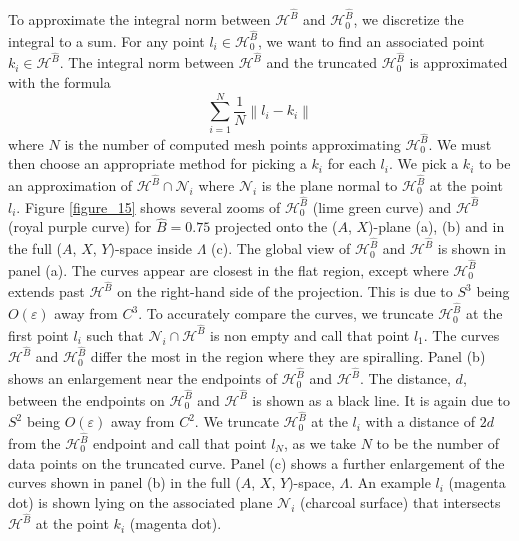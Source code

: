 \documentclass{ws-ijbc}
\begin{document}
To approximate the integral norm between $\mathscr{H}^{\widehat{B}}$ and $\mathscr{H}_0^{\widehat{B}}$, we discretize the integral to a sum.  For any point $l_i \in \mathscr{H}_0^{\widehat{B}}$, we want to find an associated point $k_i \in \mathscr{H}^{\widehat{B}}$.  The integral norm between $\mathscr{H}^{\widehat{B}}$ and the truncated $\mathscr{H}_0^{\widehat{B}}$ is approximated with the formula
	\begin{equation}
		\sum_{i=1}^{N} \frac{1}{N} \left \lVert l_i - k_i\right \lVert
		\label{integral_norm}
	\end{equation}
where $N$ is the number of computed mesh points approximating $\mathscr{H}_0^{\widehat{B}}$.  We must then choose an appropriate method for picking a $k_i$ for each $l_i$.  We pick a $k_i$ to be an approximation of $\mathscr{H}^{\widehat{B}} \cap \mathscr{N}_i$ where $\mathscr{N}_i$ is the plane normal to $\mathscr{H}_0^{\widehat{B}}$ at the point $l_i$.  Figure \ref{figure_15} shows several zooms of $\mathscr{H}_0^{\widehat{B}}$ (lime green curve) and $\mathscr{H}^{\widehat{B}}$ (royal purple curve) for $\widehat{B}=0.75$ projected onto the ($A$, $X$)-plane (a), (b) and in the full ($A$, $X$, $Y$)-space inside $\Lambda$ (c).  The global view of $\mathscr{H}_0^{\widehat{B}}$ and $\mathscr{H}^{\widehat{B}}$  is shown in panel (a).  The curves appear are closest in the flat region, except where $\mathscr{H}_0^{\widehat{B}}$ extends past $\mathscr{H}^{\widehat{B}}$ on the right-hand side of the projection.  This is due to $S^3$ being $O(\varepsilon)$ away from $C^3$.  To accurately compare the curves, we truncate $\mathscr{H}_0^{\widehat{B}}$ at the first point $l_i$ such that $\mathscr{N}_i\cap\mathscr{H}^{\widehat{B}}$ is non empty and call that point $l_1$.  The curves $\mathscr{H}^{\widehat{B}}$ and $\mathscr{H}_0^{\widehat{B}}$ differ the most in the region where they are spiralling.  Panel (b) shows an enlargement near the endpoints of $\mathscr{H}_0^{\widehat{B}}$ and $\mathscr{H}^{\widehat{B}}$.  The distance, $d$, between the endpoints on $\mathscr{H}_0^{\widehat{B}}$ and $\mathscr{H}^{\widehat{B}}$ is shown as a black line.  It is again due to $S^2$ being $O(\varepsilon)$ away from $C^2$.  We truncate $\mathscr{H}_0^{\widehat{B}}$ at the $l_i$ with a distance of $2d$ from the $\mathscr{H}_0^{\widehat{B}}$ endpoint and call that point $l_N$, as we take $N$ to be the number of data points on the truncated curve.  Panel (c) shows a further enlargement of the curves shown in panel (b) in the full ($A$, $X$, $Y$)-space, $\Lambda$.  An example $l_i$ (magenta dot) is shown lying on the associated plane $\mathscr{N}_i$ (charcoal surface) that intersects $\mathscr{H}^{\widehat{B}}$ at the point $k_i$ (magenta dot).
\end{document}
